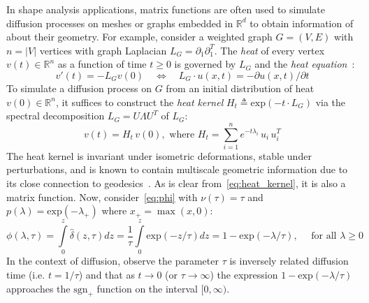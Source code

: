 \documentclass[10pt]{article}
\numberwithin{equation}{section}
\newcommand{\+}{%
	\raisebox{0.18ex}{\scaleobj{0.55}{+}}
}
\theoremstyle{definition}
\theoremstyle{definition}
\begin{document}
In shape analysis applications, matrix functions are often used to simulate diffusion processes on meshes or graphs embedded in $\mathbb{R}^d$ to obtain information of about their geometry. 
For example, consider a weighted graph $G = (V, E)$ with $n = \lvert V \rvert$ vertices with graph Laplacian $L_G = \partial_1 \partial_1^T$. 
The \emph{heat} of every vertex $v(t) \in \mathbb{R}^n$ as a function of time $t \geq 0$ is governed by $L_G$ and the \emph{heat equation}~\cite{}: 
\begin{equation}\label{eq:heat_eq}
	v'(t) = -L_G v(0) \quad \Longleftrightarrow \quad L_G \cdot u(x, t) = - \partial u(x, t) / \partial t
\end{equation}
To simulate a diffusion process on $G$ from an initial distribution of heat $v(0) \in \mathbb{R}^n$, it suffices to construct the \emph{heat kernel} $H_t \triangleq \mathrm{exp}(-t \cdot L_G)$ via the spectral decomposition $L_G = U \Lambda U^T$ of $L_G$: 
\begin{equation}\label{eq:heat_kernel}
v(t) = H_t \, v(0), \text{ where } H_t = \sum\limits_{i=1}^n e^{-t \lambda_i} \, u_i \, u_i^T
\end{equation}
The heat kernel is invariant under isometric deformations, stable under perturbations, and is known to contain multiscale geometric information due to its close connection to geodesics~\cite{}. As is clear from~\eqref{eq:heat_kernel}, it is also a matrix function. Now, consider~\eqref{eq:phi} with $\nu(\tau) = \tau$ and $p(\lambda) = \mathrm{exp}(-\lambda_+)$ where $x_+ = \max(x, 0)$: 
\begin{equation}\label{eq:tikhonov_sf}
	\phi(\lambda, \tau) = \int\limits_{0}^z \hat{\delta}(z, \tau) dz = \frac{1}{\tau}\int\limits_{0}^z \mathrm{exp}(-z / \tau) dz = 1 - \mathrm{exp}(- \lambda / \tau), \quad \text{ for all } \lambda \geq 0%
\end{equation}
In the context of diffusion, observe the parameter $\tau$ is inversely related diffusion time (i.e. $t = 1 / \tau$) and that as $t \to 0$ (or $\tau \to \infty$) the expression $1 - \mathrm{exp}(-\lambda / \tau)$ approaches the $\mathrm{sgn}_+$ function on the interval $[0, \infty)$. 
\end{document}

